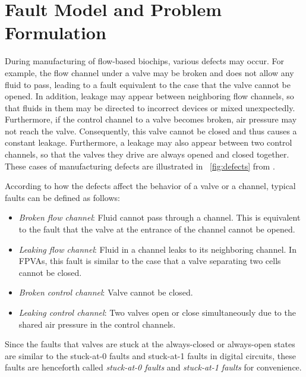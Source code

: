 
\section{Fault Model and Problem Formulation}\label{sec:formulation}

During manufacturing of flow-based biochips, various defects may occur. For
example,  the flow channel under a valve may be broken
and does not allow any fluid to pass, leading to a fault equivalent to the
case that the valve cannot be opened. In addition,  leakage may appear between
neighboring flow channels, so that fluids in them may be directed to incorrect
devices or mixed unexpectedly. Furthermore, if the control channel to a valve
becomes broken, air pressure  may not reach the valve. Consequently, this valve
cannot be closed and thus causes a constant leakage.  Furthermore, a leakage may
also appear between two control channels, so that  the valves they drive are
always opened and closed together. 
These cases of manufacturing defects are illustrated 
in \figname~\ref{fig:defects} from \cite{HuYHC14}.



According to how the defects affect the behavior of a valve or a channel,
typical faults 
can be defined as follows:

\begin{itemize}

\item \textit{Broken flow channel}: Fluid cannot pass through a channel. This is
equivalent to the fault that the valve at the entrance of the channel cannot be
opened.  

\item \textit{Leaking flow channel}: Fluid in a channel leaks to its
  neighboring channel. In FPVAs, this fault is similar to the case 
  that a valve separating two cells cannot be closed. 


\item \textit{Broken control channel}: Valve cannot be closed.

\item \textit{Leaking control channel}: Two valves open or close simultaneously
  due to the shared air pressure in the control channels.

\end{itemize}
Since the faults that valves are stuck at the always-closed or always-open
states are similar to the stuck-at-0 faults and stuck-at-1 faults in digital
circuits, these faults are henceforth called \textit{stuck-at-0 faults}
and \textit{stuck-at-1 faults} for convenience.


